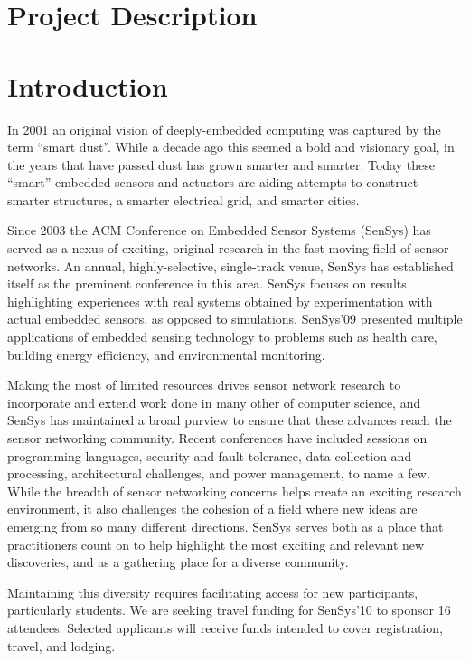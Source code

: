 \section*{Project Description}
\section{Introduction}

In 2001 an original vision of deeply-embedded computing was captured by the
term ``smart dust''. While a decade ago this seemed a bold and visionary goal,
in the years that have passed dust has grown smarter and smarter. Today these
``smart'' embedded sensors and actuators are aiding attempts to construct
smarter structures, a smarter electrical grid, and smarter cities.

Since 2003 the ACM Conference on Embedded Sensor Systems (SenSys) has served
as a nexus of exciting, original research in the fast-moving field of sensor
networks. An annual, highly-selective, single-track venue, SenSys has
established itself as the preminent conference in this area.
SenSys focuses on results highlighting experiences with real systems obtained
by experimentation with actual embedded sensors, as opposed to simulations.
SenSys'09 presented multiple applications of embedded sensing technology to
problems such as health care, building energy efficiency, and environmental
monitoring.

Making the most of limited resources drives sensor network research to
incorporate and extend work done in many other of computer science, and
SenSys has maintained a broad purview to ensure that these advances reach the
sensor networking community. Recent conferences have included sessions on
programming languages, security and fault-tolerance, data collection and
processing, architectural challenges, and power management, to name a few.
While the breadth of sensor networking concerns helps create an exciting
research environment, it also challenges the cohesion of a field where new
ideas are emerging from so many different directions. SenSys serves both as a
place that practitioners count on to help highlight the most exciting and
relevant new discoveries, and as a gathering place for a diverse community.

Maintaining this diversity requires facilitating access for new participants,
particularly students. We are seeking travel funding for SenSys'10 to sponsor
16 attendees. Selected applicants will receive funds intended to cover
registration, travel, and lodging.

